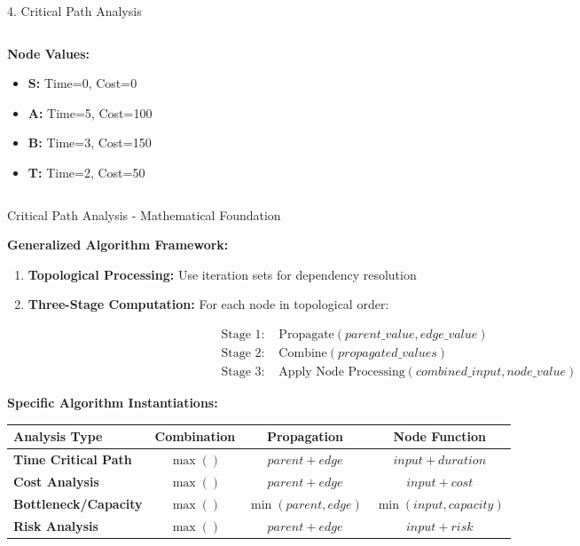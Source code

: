 \documentclass[aspectratio=169]{beamer}
\begin{document}
\begin{frame}{\textcolor{juliablue}{4. Critical Path Analysis}}
\begin{columns}
\begin{column}{0.33\textwidth}
\textbf{Node Values:}
\begin{itemize}
\item \textbf{S:} Time=0, Cost=0
\item \textbf{A:} Time=5, Cost=100  
\item \textbf{B:} Time=3, Cost=150
\item \textbf{T:} Time=2, Cost=50
\end{itemize}
\end{column}
\end{columns}
\end{frame}


\begin{frame}{\textcolor{juliablue}{Critical Path Analysis - Mathematical Foundation}}

\textbf{Generalized Algorithm Framework:}
\begin{enumerate}
\item \textbf{Topological Processing:} Use iteration sets for dependency resolution
\item \textbf{Three-Stage Computation:} For each node in topological order:

\begin{align}
\text{Stage 1: } &\text{Propagate}(parent\_value, edge\_value) \\
\text{Stage 2: } &\text{Combine}(propagated\_values) \\
\text{Stage 3: } &\text{Apply Node Processing}(combined\_input, node\_value)
\end{align}
\end{enumerate}

\vspace{0.3cm}
\textbf{Specific Algorithm Instantiations:}

\begin{center}
\begin{tabular}{|l|c|c|c|}
\hline
\textbf{Analysis Type} & \textbf{Combination} & \textbf{Propagation} & \textbf{Node Function} \\
\hline
\textbf{Time Critical Path} & $\max()$ & $parent + edge$ & $input + duration$ \\
\hline
\textbf{Cost Analysis} & $\max()$ & $parent + edge$ & $input + cost$ \\
\hline
\textbf{Bottleneck/Capacity} & $\max()$ & $\min(parent, edge)$ & $\min(input, capacity)$ \\
\hline
\textbf{Risk Analysis} & $\max()$ & $parent + edge$ & $input + risk$ \\
\hline
\end{tabular}
\end{center}

\end{frame}
\end{document}
